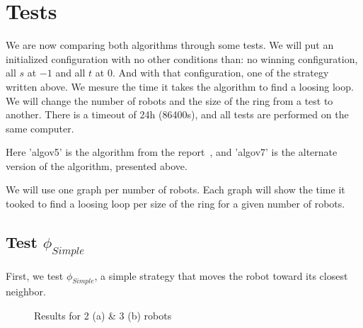 \documentclass{article}
\begin{document}
\section{Tests}

We are now comparing both algorithms through some tests. We will put an initialized configuration with no other conditions than: no winning configuration, all $s$ at $-1$ and all $t$ at $0$. And with that configuration, one of the strategy written above. We mesure the time it takes the algorithm to find a loosing loop. We will change the number of robots and the size of the ring from a test to another. There is a timeout of 24h  (86400s), and all tests are performed on the same computer.

Here 'algov5' is the algorithm from the report~\cite{algo}, and 'algov7' is the alternate version of the algorithm, presented above.

We will use one graph per number of robots. Each graph will show the time it tooked to find a loosing loop per size of the ring for a given number of robots.

\subsection{Test $\phi_{Simple}$}

First, we test $\phi_{Simple}$, a simple strategy that moves the robot toward its closest neighbor.

\begin{figure}[!ht]
    \centering
    \caption{Results for 2  (a) \& 3  (b) robots}
\end{figure}
\end{document}
